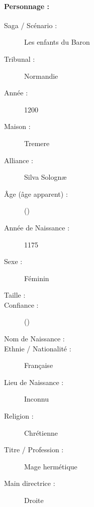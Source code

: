 \shortsheet{}



\pagestyle{fancy}
\thispagestyle{plain}
{\Large \paragraph*{\Large Personnage :} \magusname}
\begin{multicols}{2}
\begin{description}
\item[Saga / Scénario :] Les enfants du Baron
\item[Tribunal :] Normandie
\item[Année :] 1200
\item[Maison :] Tremere
\item[Alliance :] Silva Solognæ
\item[Âge (âge apparent) :] \magusage{} (\magusapparentage)
\item[Année de Naissance :] 1175
\item[Sexe :] Féminin
\item[Taille :] \magussize
\item[Confiance :] \magusconfidencescore{} (\magusconfidencepts)
\columnbreak
\item[Nom de Naissance :] \magusbirthname
\item[Ethnie /  Nationalité :] Française
\item[Lieu de Naissance :] Inconnu
\item[Religion :] Chrétienne
\item[Titre / Profession :] Mage hermétique
\item[Main directrice :] Droite
\vspace{-1em}
\end{description}
\end{multicols}
